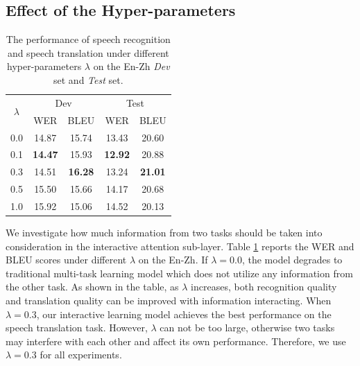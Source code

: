 \documentclass[letterpaper]{article} %
\begin{document}
\subsection{Effect of the Hyper-parameters}
\label{sec:lambda}
\begin{table}[t]
\centering
\begin{tabular}{@{}c|cc|cc@{}}
\hline
\multirow{2}{*}{$\lambda$} & \multicolumn{2}{c|}{Dev} & \multicolumn{2}{c}{Test} \\
\multicolumn{1}{c|}{}    & WER      & BLEU     & WER      & BLEU     \\
\cline{1-5}
0.0                                       & 14.87       & 15.74       & 13.43       & 20.60       \\
0.1                                        & \textbf{14.47 }      & 15.93       & \textbf{12.92  }     & 20.88       \\
0.3                                       &  14.51     &    \textbf{16.28 }     & 13.24       &      \textbf{21.01}  \\
0.5                                       &  15.50        & 15.66       & 14.17       & 20.68        \\
1.0                                       &   15.92         &  15.06          &     14.52        &    20.13        \\
\hline
\end{tabular}
\caption{The performance of speech recognition and speech translation under different hyper-parameters $\lambda$ on the En-Zh \textit{Dev} set and \textit{Test} set.}
\label{tbl:hyper-parameter}
\end{table}
We investigate how much information from two tasks should be taken into consideration in the interactive attention sub-layer. Table \ref{tbl:hyper-parameter} reports the WER and BLEU scores under different $\lambda$ on the En-Zh. If $\lambda=0.0$, the model degrades to traditional multi-task learning model which does not utilize any information from the other task. As shown in the table, as $\lambda$ increases, both recognition quality and translation quality can be improved with information interacting. When $\lambda=0.3$, our interactive learning model achieves the best performance on the speech translation task.  However, $\lambda$ can not be too large, otherwise two tasks may  interfere with each other and affect its own performance. Therefore, we use $\lambda=0.3$ for all experiments.
\end{document}
